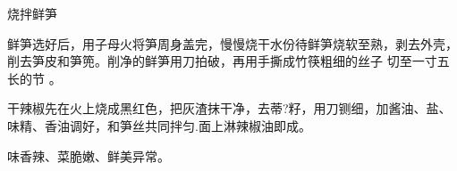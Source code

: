 \begin{recipe}{烧拌鲜笋}

\ingredients


\preparation

\step 鲜笋选好后，用子母火将笋周身盖完，慢慢烧干水份待鲜笋烧软至熟，剥去外壳，
削去笋皮和笋篼。削净的鲜笋用刀拍破，再用手撕成竹筷粗细的丝子 切至一寸五长的节
。

\step 干辣椒先在火上烧成黑红色，把灰渣抹干净，去蒂?籽，用刀铡细，加酱油、盐、
味精、香油调好，和笋丝共同拌匀.面上淋辣椒油即成。

\features

味香辣、菜脆嫩、鲜美异常。

\end{recipe}


